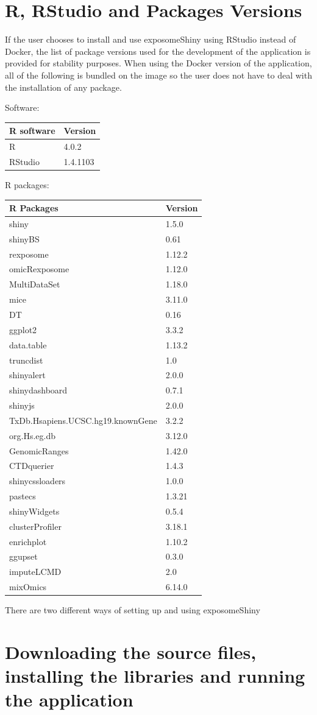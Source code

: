 \documentclass[
]{book}
\begin{document}
\hypertarget{r-rstudio-and-packages-versions}{%
\section{R, RStudio and Packages Versions}\label{r-rstudio-and-packages-versions}}

If the user chooses to install and use exposomeShiny using RStudio instead of Docker, the list of package versions used for the development of the application is provided for stability purposes. When using the Docker version of the application, all of the following is bundled on the image so the user does not have to deal with the installation of any package.

Software:

\begin{longtable}[]{@{}ll@{}}
\toprule
R software & Version\tabularnewline
\midrule
\endhead
R & 4.0.2\tabularnewline
RStudio & 1.4.1103\tabularnewline
\bottomrule
\end{longtable}

R packages:

\begin{longtable}[]{@{}ll@{}}
\toprule
R Packages & Version\tabularnewline
\midrule
\endhead
shiny & 1.5.0\tabularnewline
shinyBS & 0.61\tabularnewline
rexposome & 1.12.2\tabularnewline
omicRexposome & 1.12.0\tabularnewline
MultiDataSet & 1.18.0\tabularnewline
mice & 3.11.0\tabularnewline
DT & 0.16\tabularnewline
ggplot2 & 3.3.2\tabularnewline
data.table & 1.13.2\tabularnewline
truncdist & 1.0\tabularnewline
shinyalert & 2.0.0\tabularnewline
shinydashboard & 0.7.1\tabularnewline
shinyjs & 2.0.0\tabularnewline
TxDb.Hsapiens.UCSC.hg19.knownGene & 3.2.2\tabularnewline
org.Hs.eg.db & 3.12.0\tabularnewline
GenomicRanges & 1.42.0\tabularnewline
CTDquerier & 1.4.3\tabularnewline
shinycssloaders & 1.0.0\tabularnewline
pastecs & 1.3.21\tabularnewline
shinyWidgets & 0.5.4\tabularnewline
clusterProfiler & 3.18.1\tabularnewline
enrichplot & 1.10.2\tabularnewline
ggupset & 0.3.0\tabularnewline
imputeLCMD & 2.0\tabularnewline
mixOmics & 6.14.0\tabularnewline
\bottomrule
\end{longtable}

There are two different ways of setting up and using exposomeShiny

\hypertarget{downloading-the-source-files-installing-the-libraries-and-running-the-application}{%
\section{Downloading the source files, installing the libraries and running the application}\label{downloading-the-source-files-installing-the-libraries-and-running-the-application}}
\end{document}
